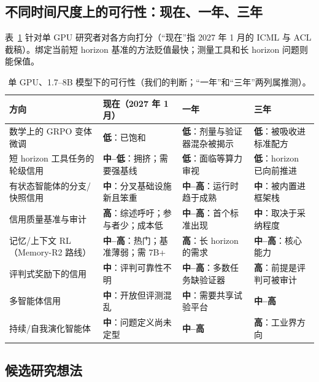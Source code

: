 \subsection{不同时间尺度上的可行性：现在、一年、三年}

表~\ref{tab:agenda-viability} 针对单 GPU 研究者对各方向打分（“现在”指 2027 年 1 月的 ICML 与 ACL 截稿）。绑定当前短 horizon 基准的方法贬值最快；测量工具和长 horizon 问题则能保值。

\begin{table}[t]
\centering
\footnotesize
\caption{单 GPU、1.7--8B 模型下的可行性（我们的判断；“一年”和“三年”两列属推测）。}
\label{tab:agenda-viability}
\begin{tabularx}{\linewidth}{@{}>{\raggedright\arraybackslash}p{2.7cm}>{\raggedright\arraybackslash}X>{\raggedright\arraybackslash}X>{\raggedright\arraybackslash}X@{}}
\toprule
方向 & 现在（2027 年 1 月） & 一年 & 三年 \\
\midrule
数学上的 GRPO 变体微调 & \textbf{低}：已饱和 & \textbf{低}：剂量与验证器混杂被揭示 & \textbf{低}：被吸收进标准配方 \\
短 horizon 工具任务的轮级信用 & \textbf{中--低}：拥挤；需要强基线 & \textbf{低}：面临等算力审视 & \textbf{低}：horizon 已向前推进 \\
有状态智能体的分支/快照信用 & \textbf{中}：分叉基础设施新且笨重 & \textbf{中--高}：运行时趋于成熟 & \textbf{中}：被内置进框架栈 \\
信用质量基准与审计 & \textbf{高}：综述呼吁；参与者少；成本低 & \textbf{中--高}：首个标准出现 & \textbf{中}：取决于采纳程度 \\
记忆/上下文 RL（Memory-R2 路线） & \textbf{中--高}：热门；基准薄弱；需 7B+ & \textbf{高}：长 horizon 的需求 & \textbf{中--高}：核心能力 \\
评判式奖励下的信用 & \textbf{中}：评判可靠性不明 & \textbf{中--高}：多数任务缺验证器 & \textbf{高}：前提是评判可被审计 \\
多智能体信用 & \textbf{中}：开放但评测混乱 & \textbf{中}：需要共享试验平台 & \textbf{中--高} \\
持续/自我演化智能体 & \textbf{中}：问题定义尚未定型 & \textbf{中--高} & \textbf{高}：工业界方向 \\
\bottomrule
\end{tabularx}
\end{table}

\subsection{候选研究想法}

